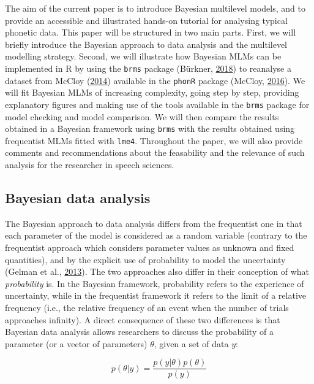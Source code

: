 \documentclass[a4paper,12pt,twoside,openright,oldfontcommands]{memoir}
\begin{document}
The aim of the current paper is to introduce Bayesian multilevel models, and to provide an accessible and illustrated hands-on tutorial for analysing typical phonetic data. This paper will be structured in two main parts. First, we will briefly introduce the Bayesian approach to data analysis and the multilevel modelling strategy. Second, we will illustrate how Bayesian MLMs can be implemented in R by using the \texttt{brms} package (Bürkner, \protect\hyperlink{ref-R-brms}{2018}) to reanalyse a dataset from McCloy (\protect\hyperlink{ref-mccloy_phonetic_2014}{2014}) available in the \texttt{phonR} package (McCloy, \protect\hyperlink{ref-R-phonR}{2016}). We will fit Bayesian MLMs of increasing complexity, going step by step, providing explanatory figures and making use of the tools available in the \texttt{brms} package for model checking and model comparison. We will then compare the results obtained in a Bayesian framework using \texttt{brms} with the results obtained using frequentist MLMs fitted with \texttt{lme4}. Throughout the paper, we will also provide comments and recommendations about the feasability and the relevance of such analysis for the researcher in speech sciences.

\hypertarget{bayesian-data-analysis}{%
\subsection{Bayesian data analysis}\label{bayesian-data-analysis}}

The Bayesian approach to data analysis differs from the frequentist one in that each parameter of the model is considered as a random variable (contrary to the frequentist approach which considers parameter values as unknown and fixed quantities), and by the explicit use of probability to model the uncertainty (Gelman et al., \protect\hyperlink{ref-gelman_bayesian_2013}{2013}). The two approaches also differ in their conception of what \emph{probability} is. In the Bayesian framework, probability refers to the experience of uncertainty, while in the frequentist framework it refers to the limit of a relative frequency (i.e., the relative frequency of an event when the number of trials approaches infinity). A direct consequence of these two differences is that Bayesian data analysis allows researchers to discuss the probability of a parameter (or a vector of parameters) \(\theta\), given a set of data \(y\):

\[p(\theta|y) = \frac{p(y|\theta)p(\theta)}{p(y)}\]
\end{document}

